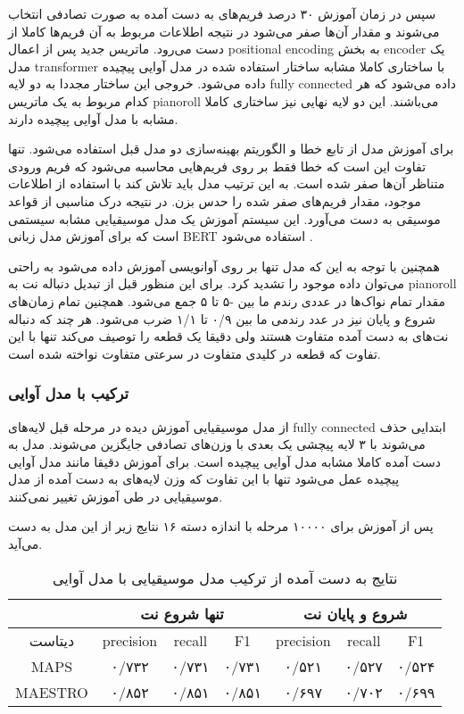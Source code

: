 سپس در زمان آموزش ۳۰ درصد فریم‌های به دست آمده به صورت تصادفی انتخاب می‌شوند و
مقدار آن‌ها صفر می‌شود در نتیجه اطلاعات مربوط به آن فریم‌ها کاملا از دست می‌رود.
ماتریس جدید پس از اعمال \gls{positional encoding} به بخش \gls{encoder} یک مدل
\gls{transformer} با ساختاری کاملا مشابه ساختار استفاده شده در مدل آوایی پیچیده
داده می‌شود. خروجی این ساختار مجددا به دو لایه \gls{fully connected} داده می‌شود
که هر کدام مربوط به یک ماتریس \gls{pianoroll} می‌باشند. این دو لایه نهایی نیز
ساختاری کاملا مشابه با مدل آوایی پیچیده دارند.

برای آموزش مدل از تابع خطا و الگوریتم بهینه‌سازی دو مدل قبل استفاده می‌شود. تنها
تفاوت این است که خطا فقط بر روی فریم‌هایی محاسبه می‌شود که فریم ورودی متناظر آن‌ها
صفر شده است. به این ترتیب مدل باید تلاش کند با استفاده از اطلاعات موجود، مقدار
فریم‌های صفر شده را حدس بزن. در نتیجه درک مناسبی از قواعد موسیقی به دست می‌آورد.
این سیستم آموزش یک مدل موسیقیایی مشابه سیستمی است که برای آموزش مدل زبانی BERT
استفاده می‌شود \cite{devlin2018bert}.

همچنین با توجه به این که مدل تنها بر روی آوانویسی آموزش داده می‌شود به راحتی
می‌توان داده موجود را تشدید کرد. برای این منظور قبل از تبدیل دنباله نت به
\gls{pianoroll} مقدار تمام نواک‌ها در عددی رندم ما بین -۵ تا ۵ جمع می‌شود.
همچنین تمام زمان‌های شروع و پایان نیز در عدد رندمی ما بین ۰/۹ تا ۱/۱ ضرب می‌شود.
هر چند که دنباله نت‌های به دست آمده متفاوت هستند ولی دقیقا یک قطعه را توصیف
می‌کند تنها با این تفاوت که قطعه در کلیدی متفاوت در سرعتی متفاوت نواخته شده است.

\subsubsection{ترکیب با مدل آوایی}
از مدل موسیقیایی آموزش دیده در مرحله قبل لایه‌های \gls{fully connected} ابتدایی
حذف می‌شوند با ۳ لایه پیچشی یک بعدی با وزن‌های تصادفی جایگزین می‌شوند. مدل به
دست آمده کاملا مشابه مدل آوایی پیچیده است. برای آموزش دقیقا مانند مدل آوایی
پیچیده عمل می‌شود تنها با این تفاوت که وزن لایه‌های به دست آمده از مدل موسیقیایی
در طی آموزش تغییر نمی‌کنند.

پس از آموزش برای ۱۰۰۰۰ مرحله با اندازه دسته ۱۶ نتایج زیر از این مدل به دست
می‌آید.
\begin{table}[ht]
    \centering
    \begin{tabular}{|c|c|c|c|c|c|c|}
        \hline
        & \multicolumn{3}{|c|}{تنها شروع نت} & \multicolumn{3}{|c|}{شروع و پایان نت} \\
        \hline
        دیتاست & \gls{precision} & \gls{recall} & F1 & \gls{precision} & \gls{recall} & F1 \\
        \hline
        MAPS & ۰/۷۳۲ & ۰/۷۳۱ & ۰/۷۳۱ & ۰/۵۲۱ & ۰/۵۲۷ & ۰/۵۲۴ \\
        \hline
        MAESTRO & ۰/۸۵۲ & ۰/۸۵۱ & ۰/۸۵۱ & ۰/۶۹۷ & ۰/۷۰۲ & ۰/۶۹۹ \\
        \hline
    \end{tabular}
    \caption{نتایج به دست آمده از ترکیب مدل موسیقیایی با مدل آوایی}
\end{table}


